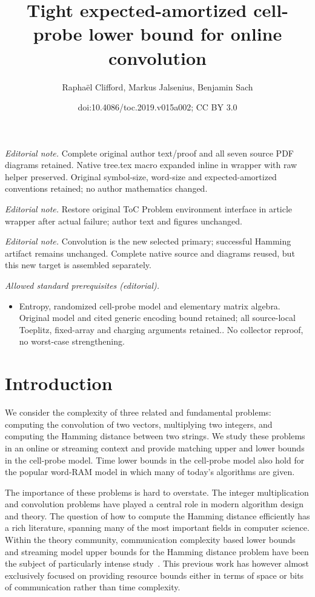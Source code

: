 \documentclass[11pt]{article}
\title{Tight expected-amortized cell-probe lower bound for online convolution}
\author{Raphaël Clifford, Markus Jalsenius, Benjamin Sach}
\date{doi:10.4086/toc.2019.v015a002; CC BY 3.0}
\numberwithin{equation}{section}
\theoremstyle{definition}
\theoremstyle{plain}
\begin{document}
\maketitle
\noindent\textit{Editorial note.} Complete original author text/proof and all seven source PDF diagrams retained. Native tree.tex macro expanded inline in wrapper with raw helper preserved. Original symbol-size, word-size and expected-amortized conventions retained; no author mathematics changed.\par\medskip
\noindent\textit{Editorial note.} Restore original ToC Problem environment interface in article wrapper after actual failure; author text and figures unchanged.\par\medskip
\noindent\textit{Editorial note.} Convolution is the new selected primary; successful Hamming artifact remains unchanged. Complete native source and diagrams reused, but this new target is assembled separately.\par\medskip
\noindent\textit{Allowed standard prerequisites (editorial).}\begin{itemize}
\item Entropy, randomized cell-probe model and elementary matrix algebra. Original model and cited generic encoding bound retained; all source-local Toeplitz, fixed-array and charging arguments retained.. No collector reproof, no worst-case strengthening.
\end{itemize}\medskip
\section{Introduction}


We consider the complexity of three related and fundamental problems: computing the convolution of two vectors, multiplying two integers, and computing the Hamming distance between two strings. We study these problems in an online or streaming context and provide matching upper and lower bounds in the cell-probe model.
Time lower bounds in the cell-probe model also hold for the popular word-RAM model in which many of today's algorithms are given. 

The importance of these problems is hard to overstate. The integer multiplication and convolution problems have played a central role in modern
%
algorithm
design and theory.  The question of how to compute the Hamming distance efficiently has a rich literature, spanning many of the most important fields in computer science. Within the theory community, communication complexity based lower bounds and streaming model upper bounds for the Hamming distance problem have been the subject of particularly intense study~\cite{CDIM:03,Woodruff:04,HSZZ:06,JKS:08,BCRT:10,Chakrabarti:11}. This previous work has however almost exclusively focused on providing resource bounds either in terms of space or bits of communication rather than time complexity.
\end{document}
